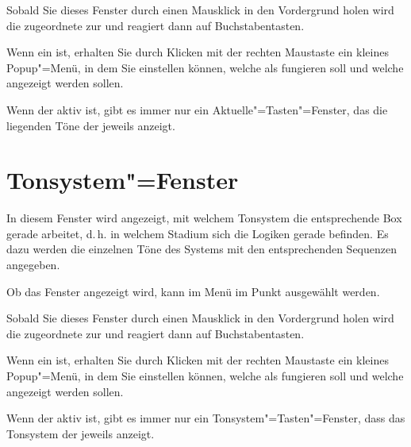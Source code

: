 {Sobald Sie dieses Fenster durch einen Mausklick in den Vordergrund
holen wird die zugeordnete  zur
 und reagiert dann auf
Buchstabentasten.


Wenn ein 
 ist, erhalten Sie durch Klicken
mit der rechten Maustaste ein kleines Popup"=Menü, in dem Sie
einstellen können, welche  als
 fungieren soll und welche
 angezeigt werden sollen.


Wenn der  aktiv ist, gibt es immer 
nur ein Aktuelle"=Tasten"=Fenster, das die liegenden Töne der 
jeweils  anzeigt.


\section{Tonsystem"=Fenster}\label{sec:DE_TS}
In diesem Fenster wird angezeigt, mit welchem Tonsystem die
entsprechende Box gerade arbeitet, d.\,h. in welchem Stadium sich die
Logiken gerade befinden. Es dazu werden die einzelnen Töne des Systems
mit den entsprechenden Sequenzen angegeben.


Ob das Fenster angezeigt wird, kann im Menü  
im Punkt  ausgewählt werden.


Sobald Sie dieses Fenster durch einen Mausklick in den Vordergrund
holen wird die zugeordnete  zur
 und reagiert dann auf
Buchstabentasten.


Wenn ein 
 ist, erhalten Sie durch Klicken
mit der rechten Maustaste ein kleines Popup"=Menü, in dem Sie
einstellen können, welche  als
 fungieren soll und welche
 angezeigt werden sollen.


Wenn der  aktiv ist, gibt es
immer nur ein Tonsystem"=Tasten"=Fenster, dass das Tonsystem der
jeweils  anzeigt.




}
